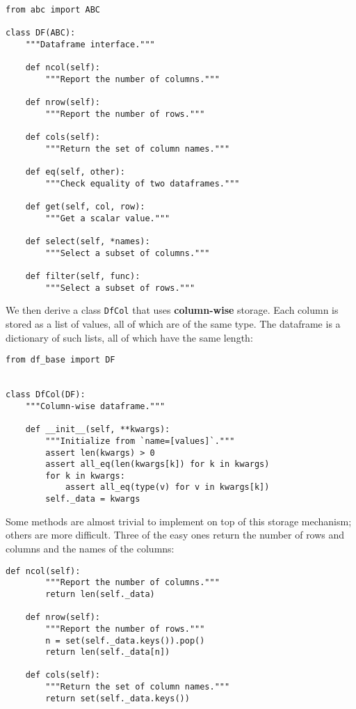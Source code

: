 \documentclass{scrbook}
\newcommand{\glossref}[1]{\textbf{#1}}
\begin{document}
\begin{lstlisting}[frame=single,frameround=tttt]
from abc import ABC

class DF(ABC):
    """Dataframe interface."""

    def ncol(self):
        """Report the number of columns."""

    def nrow(self):
        """Report the number of rows."""

    def cols(self):
        """Return the set of column names."""

    def eq(self, other):
        """Check equality of two dataframes."""

    def get(self, col, row):
        """Get a scalar value."""

    def select(self, *names):
        """Select a subset of columns."""

    def filter(self, func):
        """Select a subset of rows."""
\end{lstlisting}




We then derive a class \texttt{DfCol} that uses \glossref{column-wise} storage.
Each column is stored as a list of values,
all of which are of the same type.
The dataframe is a dictionary of such lists,
all of which have the same length:


\begin{lstlisting}[frame=single,frameround=tttt]
from df_base import DF


class DfCol(DF):
    """Column-wise dataframe."""

    def __init__(self, **kwargs):
        """Initialize from `name=[values]`."""
        assert len(kwargs) > 0
        assert all_eq(len(kwargs[k]) for k in kwargs)
        for k in kwargs:
            assert all_eq(type(v) for v in kwargs[k])
        self._data = kwargs
\end{lstlisting}



Some methods are almost trivial to implement on top of this storage mechanism;
others are more difficult.
Three of the easy ones return the number of rows and columns
and the names of the columns:


\begin{lstlisting}[frame=single,frameround=tttt]
    def ncol(self):
        """Report the number of columns."""
        return len(self._data)

    def nrow(self):
        """Report the number of rows."""
        n = set(self._data.keys()).pop()
        return len(self._data[n])

    def cols(self):
        """Return the set of column names."""
        return set(self._data.keys())
\end{lstlisting}
\end{document}
